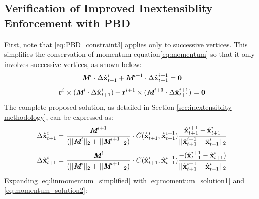 \subsection{Verification of Improved Inextensiblity Enforcement with PBD}
\label{appendix:Verification proof}
First, note that  \eqref{eq:PBD_constraint3}
 applies only to successive vertices. 
This simplifies the conservation of momentum equation\eqref{eq:momentum} so that it only involves successive vertices, as shown below:
\begin{equation}
    \label{eq:linmomentum_simplified} 
     \textit{\textbf{M}}^i \cdot \Delta \hat{\textbf{x}}^i_{t+1} + \textit{\textbf{M}}^{i+1} \cdot \Delta \hat{\textbf{x}}^{i+1}_{t+1}= \textbf{0}
\end{equation}
\begin{equation}
    \label{eq:angmomentum_simplified} 
     \textbf{r}^i \times (\textit{\textbf{M}}^i \cdot \Delta \hat{\textbf{x}}^i_{t+1}) + \textbf{r}^{i+1} \times (\textit{\textbf{M}}^{i+1} \cdot \Delta \hat{\textbf{x}}^{i+1}_{t+1})= \textbf{0}
\end{equation}
The complete proposed solution, as detailed in Section \ref{sec:inextensiblity methodology}, can be expressed as:
\begin{equation}
    \label{eq:momentum_solution1} 
     \Delta \hat{\textbf{x}}^i_{t+1} = \frac{\textit{\textbf{M}}^{i+1}}{(||\textit{\textbf{M}}^{i}||_2+||\textit{\textbf{M}}^{i+1}||_2)} \cdot C(\hat{\textbf{x}}^i_{t+1},\hat{\textbf{x}}^{i+1}_{t+1})\frac{\hat{\textbf{x}}^{i+1}_{t+1} - \hat{\textbf{x}}^{i}_{t+1}}{||\hat{\textbf{x}}^{i+1}_{t+1} - \hat{\textbf{x}}^{i}_{t+1}||_2}
\end{equation}
\begin{equation}
    \label{eq:momentum_solution2} 
     \Delta \hat{\textbf{x}}^i_{t+1} = \frac{\textit{\textbf{M}}^{i}}{(||\textit{\textbf{M}}^{i}||_2 + ||\textit{\textbf{M}}^{i+1}||_2)}\cdot C(\hat{\textbf{x}}^i_{t+1},\hat{\textbf{x}}^{i+1}_{t+1})\frac{-(\hat{\textbf{x}}^{i+1}_{t+1} - \hat{\textbf{x}}^{i}_{t+1})}{||\hat{\textbf{x}}^{i+1}_{t+1} - \hat{\textbf{x}}^{i}_{t+1}||_2}
\end{equation}
Expanding \eqref{eq:linmomentum_simplified} with \eqref{eq:momentum_solution1} and \eqref{eq:momentum_solution2}:
